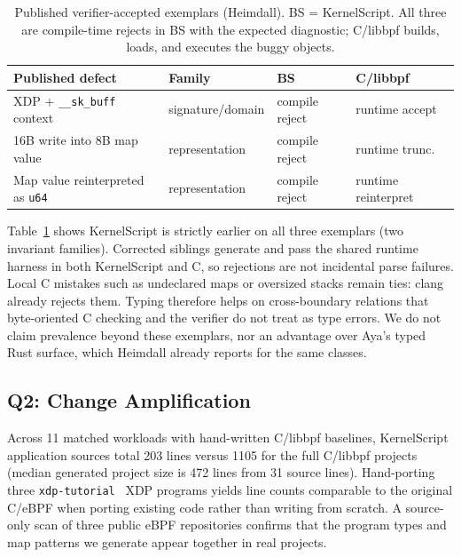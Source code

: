 \documentclass[sigplan,10pt,nonacm]{acmart}
\newcommand{\tool}{KernelScript}
\begin{document}
\begin{table}[H]
\centering
\caption{Published verifier-accepted exemplars (Heimdall). BS = \tool{}.
All three are compile-time rejects in BS with the expected diagnostic; C/libbpf
builds, loads, and executes the buggy objects.}
\label{tab:published}
\footnotesize
\begin{tabular}{@{}>{\raggedright\arraybackslash}p{}>{\raggedright\arraybackslash}p{}>{\centering\arraybackslash}p{}>{\centering\arraybackslash}p{}@{}}
\toprule
Published defect & Family & BS & C/libbpf \\
\midrule
XDP + \texttt{\_\_sk\_buff} context & signature/domain & compile reject & runtime accept \\
16B write into 8B map value & representation & compile reject & runtime trunc. \\
Map value reinterpreted as \texttt{u64} & representation & compile reject & runtime reinterpret \\
\bottomrule
\end{tabular}
\end{table}

Table~\ref{tab:published} shows \tool{} is strictly earlier on all three exemplars (two invariant families). Corrected siblings generate and pass the shared runtime harness in both \tool{} and C, so rejections are not incidental parse failures. Local C mistakes such as undeclared maps or oversized stacks remain ties: clang already rejects them. Typing therefore helps on cross-boundary relations that byte-oriented C checking and the verifier do not treat as type errors. We do not claim prevalence beyond these exemplars, nor an advantage over Aya's typed Rust surface, which Heimdall already reports for the same classes.

\FloatBarrier
\subsection{Q2: Change Amplification}

Across 11 matched workloads with hand-written C/libbpf baselines, \tool{} application sources total 203 lines versus 1105 for the full C/libbpf projects (median generated project size is 472 lines from 31 source lines). Hand-porting three \texttt{xdp-tutorial}~\cite{xdp-tutorial} XDP programs yields line counts comparable to the original C/eBPF when porting existing code rather than writing from scratch. A source-only scan of three public eBPF repositories confirms that the program types and map patterns we generate appear together in real projects.
\end{document}

